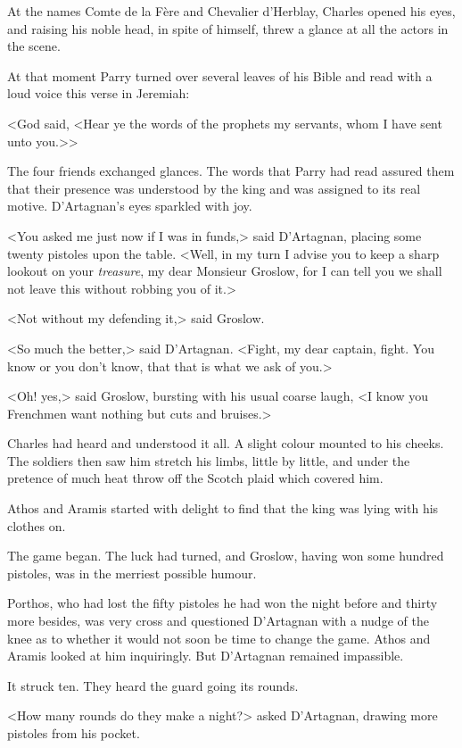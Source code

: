 At the names Comte de la Fère and Chevalier d'Herblay, Charles opened his eyes, and raising his noble head, in spite of himself, threw a glance at all the actors in the scene.

At that moment Parry turned over several leaves of his Bible and read with a loud voice this verse in Jeremiah:

<God said, <Hear ye the words of the prophets my servants, whom I have sent unto you.>>

The four friends exchanged glances. The words that Parry had read assured them that their presence was understood by the king and was assigned to its real motive. D'Artagnan's eyes sparkled with joy.

<You asked me just now if I was in funds,> said D'Artagnan, placing some twenty pistoles upon the table. <Well, in my turn I advise you to keep a sharp lookout on your \emph{treasure}, my dear Monsieur Groslow, for I can tell you we shall not leave this without robbing you of it.>

<Not without my defending it,> said Groslow.

<So much the better,> said D'Artagnan. <Fight, my dear captain, fight. You know or you don't know, that that is what we ask of you.>

<Oh! yes,> said Groslow, bursting with his usual coarse laugh, <I know you Frenchmen want nothing but cuts and bruises.>

Charles had heard and understood it all. A slight colour mounted to his cheeks. The soldiers then saw him stretch his limbs, little by little, and under the pretence of much heat throw off the Scotch plaid which covered him.

Athos and Aramis started with delight to find that the king was lying with his clothes on.

The game began. The luck had turned, and Groslow, having won some hundred pistoles, was in the merriest possible humour.

Porthos, who had lost the fifty pistoles he had won the night before and thirty more besides, was very cross and questioned D'Artagnan with a nudge of the knee as to whether it would not soon be time to change the game. Athos and Aramis looked at him inquiringly. But D'Artagnan remained impassible.

It struck ten. They heard the guard going its rounds.

<How many rounds do they make a night?> asked D'Artagnan, drawing more pistoles from his pocket.

